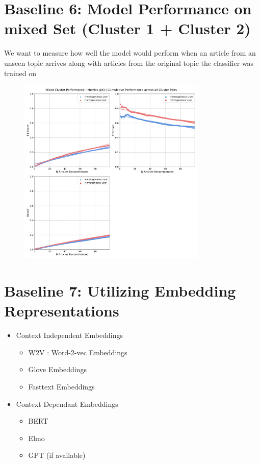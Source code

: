 \documentclass[a4paper,fontsize=9.0pt]{scrartcl}
\begin{document}
\vspace{1ex}
\section{Baseline 6: Model Performance on mixed Set (Cluster 1 + Cluster 2)}
\begin{flushleft}
We want to measure how well the model would perform when an article from an unseen topic arrives along with articles from the original topic the classifier was trained on
\end{flushleft}
\begin{figure}[H]
 \includegraphics[width=0.8\textwidth]{Graphs/user_interaction_vs_model_performance_cumu_mixed_cluster.pdf}
\end{figure}

\vspace{1ex}
\section{Baseline 7: Utilizing Embedding Representations}
\begin{flushleft}
\begin{itemize}
    \item Context Independent Embeddings
    \begin{itemize}
         \item W2V : Word-2-vec Embeddings
        \item Glove Embeddings
        \item Fasttext Embeddings 
    \end{itemize}
    \item Context Dependant Embeddings
    \begin{itemize}
        \item BERT
        \item Elmo
        \item GPT (if available)
    \end{itemize}
\end{itemize}
\end{flushleft}
\end{document}
